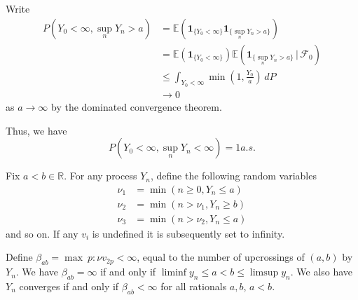 \documentclass[10pt, oneside, reqno]{amsart}
\theoremstyle{plain}%
\theoremstyle{definition}
\theoremstyle{remark}
\newcommand{\given}{ \, | \,}
\newcommand{\sigf}{\mathcal{F}}
\newcommand{\R}{\mathbb{R}}
\newcommand{\E}{\mathbb{E}}
\newcommand{\indic}[1]{\mathbf{1}_{\{ #1 \}} }
\begin{document}
Write \begin{align*}
    P(Y_0 < \infty, \sup_{n} Y_n > a) &= \E(\indic{Y_0 < \infty} \indic{\sup_n Y_n > a}) \\
                                    &= \E(\indic{Y_0 < \infty}) \E(\indic{\sup_n Y_n > a} \given \sigf_0) \\
                                    &\leq \int_{Y_0 < \infty} \min(1, \frac{Y_0}{a}) \, dP \\
                                    &\rightarrow 0
\end{align*} as $a \rightarrow \infty$ by the dominated convergence theorem.  

Thus, we have \[
    P(Y_0 < \infty, \sup_{n} Y_n < \infty) = 1 a.s.
\]

Fix $a < b \in \R$.  For any process $Y_n$, define the following random variables \begin{align*}
    \nu_1 &= \min(n \geq 0, Y_n \leq a) \\
    \nu_2 &= \min(n > \nu_1, Y_n \geq b) \\
    \nu_3 &= \min(n > \nu_2, Y_n \leq a)
\end{align*} and so on.  If any $v_i$ is undefined it is subsequently set to infinity.

Define $\beta_{ab} = \max\ { p : \nu v_{2p} < \infty}$, equal to the number of upcrossings of $(a,b)$ by $Y_n$.  We have $\beta_{ab} = \infty$ if and only if $\liminf y_n \leq a < b \leq \limsup y_n$.  We also have $Y_n$ converges if and only if $\beta_{ab} < \infty$ for all rationals $a,b$, $a < b$.  
\end{document}

